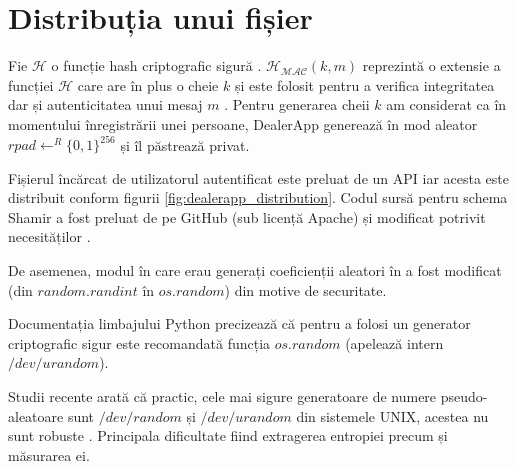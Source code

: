 \documentclass[oneside, 12pt]{book}
\begin{document}
\section{Distribuția unui fișier}

Fie $\mathcal{H}$ o funcție hash criptografic sigură \cite{Katz:2007}. $\mathcal{H_{MAC}}(k, m)$ reprezintă o extensie a funcției $\mathcal{H}$ care are în plus o cheie $k$ și este folosit pentru a verifica integritatea dar și autenticitatea unui mesaj $m$ \cite{krawczyk1997hmac}. Pentru generarea cheii $k$ am considerat ca în momentului înregistrării unei persoane, DealerApp generează în mod aleator $rpad \leftarrow^R \{0,1\}^{256}$ și îl păstrează privat.

Fișierul încărcat de utilizatorul autentificat este preluat de un API iar acesta este distribuit conform figurii \ref{fig:dealerapp_distribution}. Codul sursă pentru schema Shamir a fost preluat de pe GitHub (sub licență Apache) și modificat potrivit necesităților \cite{website:pysss-github}.

De asemenea, modul în care erau generați coeficienții aleatori în \cite{website:pysss-github} a fost modificat (din $random.randint$ în $os.random$) din motive de securitate.

Documentația limbajului Python precizează că pentru a folosi un generator criptografic sigur este recomandată funcția $os.random$ (apelează intern $/dev/urandom$).

Studii recente arată că practic, cele mai sigure generatoare de numere pseudo-aleatoare sunt $/dev/random$ și $/dev/urandom$ din sistemele UNIX, acestea nu sunt robuste \cite{dodis2013security}. Principala dificultate fiind extragerea entropiei precum și măsurarea ei.
\end{document}
